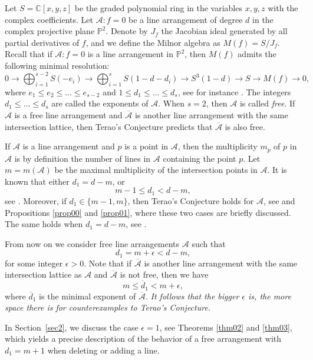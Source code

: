 \documentclass[12pt]{amsart}
\theoremstyle{plain}
\theoremstyle{definition}
\numberwithin{equation}{section}
\newcommand{\A}{{\mathcal A}}
\newcommand{\C}{\mathbb{C}}
\newcommand{\PP}{\mathbb{P}}
\begin{document}
Let $S=\C[x,y,z]$ be the graded polynomial ring in the variables $x,y,z$ with the complex coefficients. Let $\A : f=0$ be a line arrangement of degree $d$ in the complex projective plane $\PP^2$. Denote by $J_{f}$ the Jacobian ideal generated by all partial derivatives of $f$, and we define the Milnor algebra as $M(f) = S/J_{f}$. Recall that if $\A : f=0$ is a line arrangement in $\mathbb{P}^{2}$, then $M(f)$ admits the following minimal resolution: 
$$0 \rightarrow \bigoplus_{i=1}^{s-2}S(-e_{i}) \rightarrow \bigoplus_{i=1}^{s}S(1-d - d_{i}) \rightarrow S^{3}(1-d)\rightarrow S \rightarrow M(f) \rightarrow 0,$$
where $e_{1} \leq e_{2} \leq \ldots \leq e_{s-2}$ and $1\leq d_{1} \leq \ldots \leq d_{s}$, see for instance \cite{HS}. The integers $d_1 \leq \ldots \leq d_s$ are called the exponents of $\A$. When $s=2$, then $\A$ is called \textit{free}. If $\A$ is a free line arrangement and $\overline \A$ is another line arrangement with the same intersection lattice, then
Terao's Conjecture predicts that $\overline \A$ is also free.

If $\A$ is a line arrangement and $p$ is a point in $\A$, then the multiplicity $m_p$ of $p$ in $\A$ is by definition the number of lines in $\A$ containing the point $p$. Let $m=m(\A)$ be the maximal multiplicity of the intersection points in $\A$. It is known that either $d_1=d-m$, or
$$m-1 \leq d_1 <d-m,$$
see \cite{Mich}. Moreover, if $d_1 \in \{m-1,m\}$, then Terao's Conjecture holds for $\A$, see \cite[Remark 5.4]{Der} and Propositions \ref{prop00} and \ref{prop01}, where these two cases are briefly discussed.
The same holds when $d_1=d-m$, see \cite{Mich}.

From now on we consider free line arrangements $\A$ such that
$$d_1=m+ \epsilon <d-m,$$
for some integer $\epsilon >0$.
Note that if $\overline \A$ is another line arrangement with the same intersection lattice as $\A$ and $\overline \A$ is not free, then we have
$$m \leq \overline d_1 < m+ \epsilon,$$
where $\overline d_1$ is the minimal exponent of $\overline \A$.
{\it It follows that the bigger $\epsilon$ is, the more space there is for counterexamples to Terao's Conjecture.} 

In Section~\ref{sec2}, we discuss the case $\epsilon =1$, see Theorems \ref{thm02} and \ref{thm03}, which yields a precise description of the behavior of a free arrangement with $d_1=m+1$ when deleting or adding a line.
\end{document}
